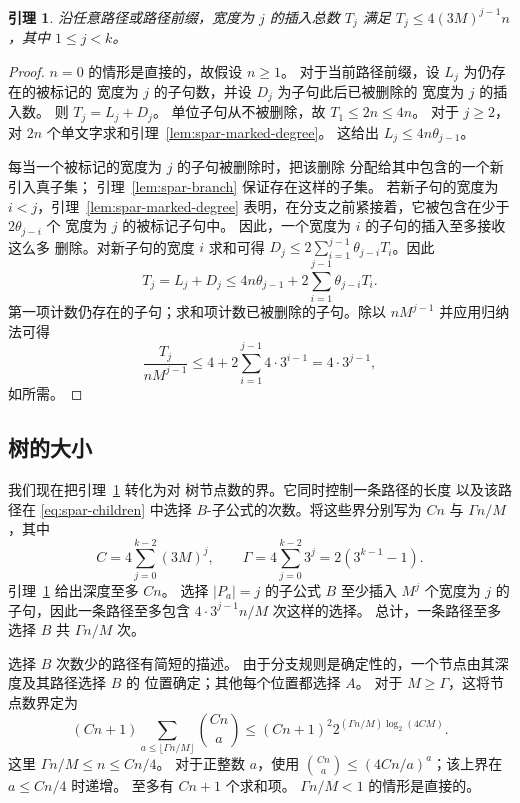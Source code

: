 \documentclass[11pt,reqno]{amsart}
\numberwithin{equation}{section}
\newtheorem{lemma}[theorem]{引理}
\theoremstyle{definition}\newtheorem{definition}[theorem]{定义}
\theoremstyle{remark}\newtheorem{remark}[theorem]{注}
\renewcommand{\le}{\leqslant}
\renewcommand{\ge}{\geqslant}
\begin{document}
\begin{lemma}\label{lem:spar-insertion-bound}
沿任意路径或路径前缀，宽度为 $j$ 的插入总数 $T_j$
满足 $T_j\le4(3M)^{j-1}n$，其中 $1\le j<k$。
\end{lemma}
\begin{proof}
$n=0$ 的情形是直接的，故假设 $n\ge1$。
对于当前路径前缀，设 $L_j$ 为仍存在的被标记的
宽度为 $j$ 的子句数，并设 $D_j$ 为子句此后已被删除的
宽度为 $j$ 的插入数。
则 $T_j=L_j+D_j$。
单位子句从不被删除，故 $T_1\le2n\le4n$。
对于 $j\ge2$，对 $2n$ 个单文字求和引理~\ref{lem:spar-marked-degree}。
这给出 $L_j\le4n\theta_{j-1}$。

每当一个被标记的宽度为 $j$ 的子句被删除时，把该删除
分配给其中包含的一个新引入真子集；
引理~\ref{lem:spar-branch} 保证存在这样的子集。
若新子句的宽度为 $i<j$，引理~\ref{lem:spar-marked-degree}
表明，在分支之前紧接着，它被包含在少于 $2\theta_{j-i}$ 个
宽度为 $j$ 的被标记子句中。
因此，一个宽度为 $i$ 的子句的插入至多接收这么多
删除。对新子句的宽度 $i$ 求和可得
$D_j\le2\sum_{i=1}^{j-1}\theta_{j-i}T_i$。因此
\begin{equation}\label{eq:spar-insertions}
 T_j=L_j+D_j\le4n\theta_{j-1}
       +2\sum_{i=1}^{j-1}\theta_{j-i}T_i.
\end{equation}
第一项计数仍存在的子句；求和项计数已被删除的子句。除以
$nM^{j-1}$ 并应用归纳法可得
\[
 \frac{T_j}{nM^{j-1}}
 \le4+2\sum_{i=1}^{j-1}4\cdot3^{i-1}
 =4\cdot3^{j-1},
\]
如所需。
\end{proof}

\subsection{树的大小}
我们现在把引理~\ref{lem:spar-insertion-bound} 转化为对
树节点数的界。它同时控制一条路径的长度
以及该路径在
\eqref{eq:spar-children} 中选择 $B$-子公式的次数。将这些界分别写为 $Cn$ 与
$\Gamma n/M$，其中
\[
 C=4\sum_{j=0}^{k-2}(3M)^j,\qquad
 \Gamma=4\sum_{j=0}^{k-2}3^j=2(3^{k-1}-1).
\]
引理~\ref{lem:spar-insertion-bound} 给出深度至多 $Cn$。
选择 $|P_a|=j$ 的子公式 $B$ 至少插入 $M^j$
个宽度为 $j$ 的子句，因此一条路径至多包含
$4\cdot3^{j-1}n/M$ 次这样的选择。
总计，一条路径至多选择 $B$ 共 $\Gamma n/M$ 次。

选择 $B$ 次数少的路径有简短的描述。
由于分支规则是确定性的，一个节点由其深度及其路径选择 $B$ 的
位置确定；其他每个位置都选择 $A$。
对于 $M\ge\Gamma$，这将节点数界定为
\[
 (Cn+1)\sum_{a\le\lfloor\Gamma n/M\rfloor}\binom{Cn}{a}
 \le (Cn+1)^2
       2^{(\Gamma n/M)\log_2(4CM)}.
\]
这里 $\Gamma n/M\le n\le Cn/4$。
对于正整数 $a$，使用
$\binom{Cn}{a}\le(4Cn/a)^a$；该上界在
$a\le Cn/4$ 时递增。
至多有 $Cn+1$ 个求和项。
$\Gamma n/M<1$ 的情形是直接的。
\end{document}
